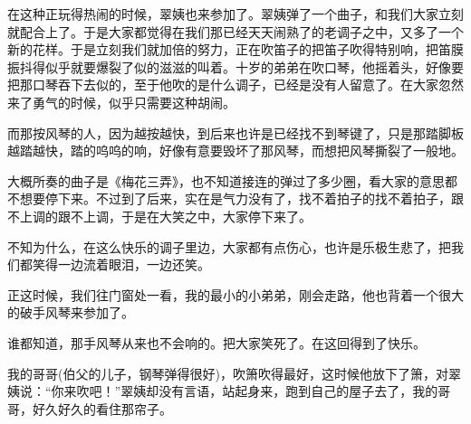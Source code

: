 \par 在这种正玩得热闹的时候，翠姨也来参加了。翠姨弹了一个曲子，和我们大家立刻就配合上了。于是大家都觉得在我们那已经天天闹熟了的老调子之中，又多了一个新的花样。于是立刻我们就加倍的努力，正在吹笛子的把笛子吹得特别响，把笛膜振抖得似乎就要爆裂了似的滋滋的叫着。十岁的弟弟在吹口琴，他摇着头，好像要把那口琴吞下去似的，至于他吹的是什么调子，已经是没有人留意了。在大家忽然来了勇气的时候，似乎只需要这种胡闹。
\par 而那按风琴的人，因为越按越快，到后来也许是已经找不到琴键了，只是那踏脚板越踏越快，踏的呜呜的响，好像有意要毁坏了那风琴，而想把风琴撕裂了一般地。
\par 大概所奏的曲子是《梅花三弄》，也不知道接连的弹过了多少圈，看大家的意思都不想要停下来。不过到了后来，实在是气力没有了，找不着拍子的找不着拍子，跟不上调的跟不上调，于是在大笑之中，大家停下来了。
\par 不知为什么，在这么快乐的调子里边，大家都有点伤心，也许是乐极生悲了，把我们都笑得一边流着眼泪，一边还笑。
\par 正这时候，我们往门窗处一看，我的最小的小弟弟，刚会走路，他也背着一个很大的破手风琴来参加了。
\par 谁都知道，那手风琴从来也不会响的。把大家笑死了。在这回得到了快乐。
\par 我的哥哥(伯父的儿子，钢琴弹得很好)，吹箫吹得最好，这时候他放下了箫，对翠姨说：“你来吹吧！”翠姨却没有言语，站起身来，跑到自己的屋子去了，我的哥哥，好久好久的看住那帘子。
